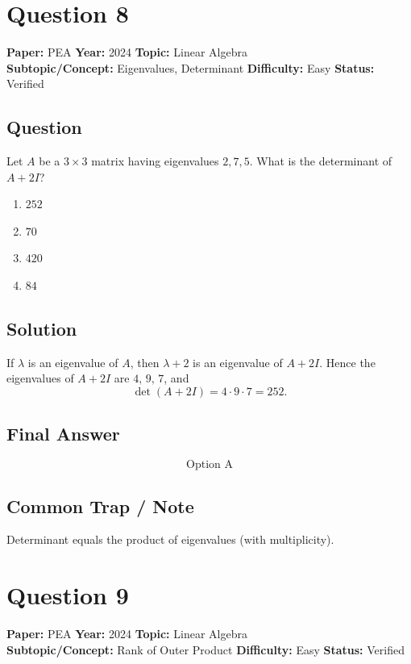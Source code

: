 \documentclass[11pt]{article}
\begin{document}
\section*{Question 8}
\textbf{Paper:} PEA \quad \textbf{Year:} 2024 \quad \textbf{Topic:} Linear Algebra \\
\textbf{Subtopic/Concept:} Eigenvalues, Determinant \quad \textbf{Difficulty:} Easy \quad \textbf{Status:} Verified

\subsection*{Question}
Let $A$ be a $3\times 3$ matrix having eigenvalues $2,7,5$. What is the determinant of $A+2I$?
\begin{enumerate}[label=(\Alph*)]
\item $252$
\item $70$
\item $420$
\item $84$
\end{enumerate}

\subsection*{Solution}
If $\lambda$ is an eigenvalue of $A$, then $\lambda+2$ is an eigenvalue of $A+2I$. Hence the eigenvalues of $A+2I$ are $4,\,9,\,7$, and
\[
\det(A+2I)=4\cdot 9\cdot 7=252.
\]

\subsection*{Final Answer}
\[
\boxed{\text{Option A}}
\]

\subsection*{Common Trap / Note}
Determinant equals the product of eigenvalues (with multiplicity).

\section*{Question 9}
\textbf{Paper:} PEA \quad \textbf{Year:} 2024 \quad \textbf{Topic:} Linear Algebra \\
\textbf{Subtopic/Concept:} Rank of Outer Product \quad \textbf{Difficulty:} Easy \quad \textbf{Status:} Verified
\end{document}
